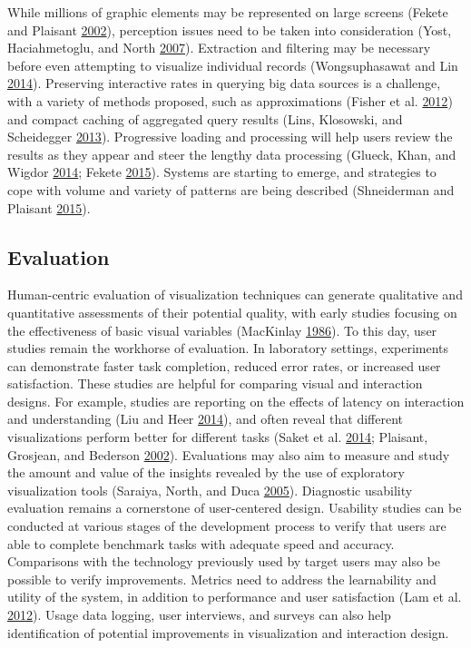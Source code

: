 \documentclass[]{krantz}
\begin{document}
While millions of graphic elements may be represented on large screens
(Fekete and Plaisant
\protect\hyperlink{ref-fekete2002interactive}{2002}), perception issues
need to be taken into consideration (Yost, Haciahmetoglu, and North
\protect\hyperlink{ref-yost2007beyond}{2007}). Extraction and filtering
may be necessary before even attempting to visualize individual records
(Wongsuphasawat and Lin
\protect\hyperlink{ref-wongsuphasawat2014using}{2014}). Preserving
interactive rates in querying big data sources is a challenge, with a
variety of methods proposed, such as approximations (Fisher et al.
\protect\hyperlink{ref-fisher2012trust}{2012}) and compact caching of
aggregated query results (Lins, Klosowski, and Scheidegger
\protect\hyperlink{ref-lins2013nanocubes}{2013}). Progressive loading
and processing will help users review the results as they appear and
steer the lengthy data processing (Glueck, Khan, and Wigdor
\protect\hyperlink{ref-glueck2014dive}{2014}; Fekete
\protect\hyperlink{ref-fekete2015progressivis}{2015}). Systems are
starting to emerge, and strategies to cope with volume and variety of
patterns are being described (Shneiderman and Plaisant
\protect\hyperlink{ref-shneiderman2015sharpening}{2015}).

\subsection{Evaluation}\label{sec:viz-4.2}

Human-centric evaluation of visualization techniques can generate
qualitative and quantitative assessments of their potential quality,
with early studies focusing on the effectiveness of basic visual
variables (MacKinlay
\protect\hyperlink{ref-mackinlay1986automating}{1986}). To this day,
user studies remain the workhorse of evaluation. In laboratory settings,
experiments can demonstrate faster task completion, reduced error rates,
or increased user satisfaction. These studies are helpful for comparing
visual and interaction designs. For example, studies are reporting on
the effects of latency on interaction and understanding (Liu and Heer
\protect\hyperlink{ref-liu2014effects}{2014}), and often reveal that
different visualizations perform better for different tasks (Saket et
al. \protect\hyperlink{ref-saket2014node}{2014}; Plaisant, Grosjean, and
Bederson \protect\hyperlink{ref-plaisant2002spacetree}{2002}).
Evaluations may also aim to measure and study the amount and value of
the insights revealed by the use of exploratory visualization tools
(Saraiya, North, and Duca
\protect\hyperlink{ref-saraiya2005insight}{2005}). Diagnostic usability
evaluation remains a cornerstone of user-centered design. Usability
studies can be conducted at various stages of the development process to
verify that users are able to complete benchmark tasks with adequate
speed and accuracy. Comparisons with the technology previously used by
target users may also be possible to verify improvements. Metrics need
to address the learnability and utility of the system, in addition to
performance and user satisfaction (Lam et al.
\protect\hyperlink{ref-lam2012empirical}{2012}). Usage data logging,
user interviews, and surveys can also help identification of potential
improvements in visualization and interaction design.
\end{document}
